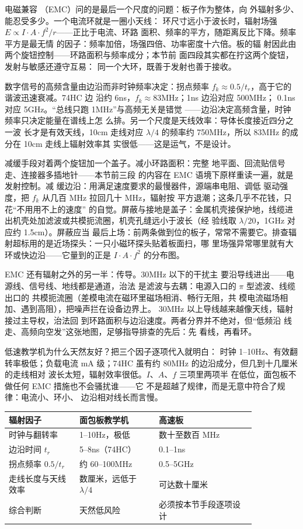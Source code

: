 电磁兼容
（EMC）问的是最后一个尺度的问题：板子作为整体，向
外辐射多少、能忍受多少。一个电流环就是一圈小天线：
环尺寸远小于波长时，辐射场强
$E\propto I\cdot A\cdot f^2/r$——正比于电流、环路
面积、频率的平方，随距离反比下降。频率平方是最无情
的因子：频率加倍，场强四倍、功率密度十六倍。板的辐
射因此由两个旋钮控制——环路面积与频率成分；本节前
面四段其实都在拧这两个旋钮，发射与敏感还遵守互易：
同一个大环，既善于发射也善于接收。

数字信号的高频含量由边沿而非时钟频率决定：拐点频率
$f_k\approx0.5/t_r$，高于它的谐波迅速衰减。74HC 边
沿约 6ns，$f_k\approx83$MHz；1ns 边沿对应 500MHz；
0.1ns 对应 5GHz。“总线只跑 1MHz”与高频无关是错觉
——边沿决定高频含量，时钟频率只决定能量在谱线上怎
么排。另一个尺度是天线效率：导体长度接近四分之一波
长才是有效天线，10cm 走线对应 $\lambda/4$ 的频率约
750MHz，所以 83MHz 的成分在 10cm 走线上辐射效率其
实很低——这是运气，不是设计。

减缓手段对着两个旋钮加一个盖子。减小环路面积：完整
地平面、回流贴信号走、连接器多插地针——本节前三段
的内容在 EMC 语境下原样重读一遍，就是发射控制。减
缓边沿：用满足速度要求的最慢器件，源端串电阻、调低
驱动强度，把 $f_k$ 从几百 MHz 拉回几十 MHz，辐射按
平方退潮；这条几乎不花钱，只花“不用用不上的速度”
的自觉。屏蔽与接地是盖子：金属机壳接保护地，线缆进
出机壳处加滤波或共模扼流圈，机壳孔缝远小于波长（经
验线取 $\lambda/20$，1GHz 对应约 1.5cm）。屏蔽应当
最后上场：前两条做到位的板子，常常不需要它。排查辐
射超标用的是近场探头：一只小磁环探头贴着板面扫，哪
里场强异常哪里就有大环或快边沿——它量到的正是
$I\cdot A\cdot f^2$ 的分布图。

EMC 还有辐射之外的另一半：传导。30MHz 以下的干扰主
要沿导线进出——电源线、信号线、地线都是通道，治法
是滤波与去耦：电源入口的 $\pi$ 型滤波、线缆出口的
共模扼流圈（差模电流在磁环里磁场相消、畅行无阻，共
模电流磁场相加、遇到高阻），把噪声拦在设备边界上。
30MHz 以上导线越来越像天线，辐射接过主导权，治法回
到环路面积与边沿速度。两者分界并不绝对，但“低频沿
线走、高频向空发”这张地图，足够指导排查的先后：先
看线，再看环。

低速教学机为什么天然友好？把三个因子逐项代入就明白：
时钟 1--10Hz、有效翻转率极低；负载电流 mA 级；74HC
虽有约 80MHz 的边沿成分，但几到十几厘米的走线相对
波长太短，辐射效率很低。$I$、$A$、$f$ 三项里两项半
在低位，面包板不做任何 EMC 措施也不会骚扰谁——它
不是超越了规律，而是无意中符合了规律：电流小、环小、
边沿相对线长而言慢。

\begin{longtable}{L{0.24\linewidth}L{0.27\linewidth}L{0.33\linewidth}}
\toprule
辐射因子 & 面包板教学机 & 高速板 \\
\midrule
时钟与翻转率 & 1--10Hz，极低 & 数十至数百 MHz \\
边沿时间 $t_r$ & 5--8ns（74HC） & 0.1--1ns \\
拐点频率 $0.5/t_r$ & 约 60--100MHz & 0.5--5GHz \\
走线长度与天线效率 & 数厘米，远低于 $\lambda/4$ & 可达数十厘米 \\
综合判断 & 天然低风险 & 必须按本节手段逐项设计 \\
\bottomrule
\end{longtable}

